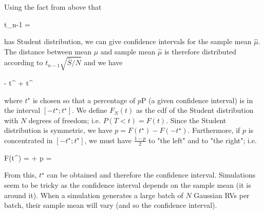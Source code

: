 Using the fact from above that 

\bee
t_{n-1} = 
\eee

has Student distribution, we can give confidence intervals for the sample mean $\hat \mu$. The distance between mean $\mu$ and sample mean $\hat \mu$ is therefore distributed according to $t_{n-1} \sqrt{\hat S / N}$ and we have

\bee
\hat \mu - t^\star {} \leq \mu \leq \hat \mu + t^\star {}
\eee

where $t^\star$ is chosen so that a percentage of $p$P (a given confidence interval) is in the interval $[-t^\star; t^\star]$. We define $F_N(t)$ as the cdf of the Student distribution with $N$ degrees of freedom; i.e. $P(T<t) = F(t)$. Since the Student distribution is symmetric, we have $p = F(t^\star) - F(-t^\star)$. Furthermore, if $p$ is concentrated in $[-t^\star; t^\star]$, we must have $\frac{1-p}{2}$ to "the left" and to "the right"; i.e.

\bee
F(t^\star) =  + p = 
\eee

From this, $t^\star$ can be obtained and therefore the confidence interval. Simulations seem to be tricky as the confidence interval depends on the sample mean (it is around it). When a simulation generates a large batch of $N$ Gaussian RVs per batch, their sample mean will vary (and so the confidence interval).



